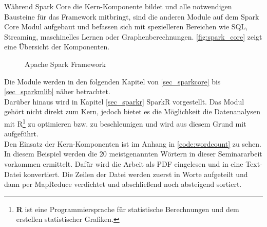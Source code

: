 \noindent
Während Spark Core die Kern-Komponente bildet und alle notwendigen Bausteine für das Framework mitbringt, sind die anderen Module auf dem Spark Core Modul aufgebaut und befassen sich mit spezielleren Bereichen wie SQL, Streaming, maschinelles Lernen oder Graphenberechnungen. \autoref{fig:spark_core} zeigt eine Übersicht der Komponenten. \\

\begin{figure}[h]
  \centering
  \caption{Apache Spark Framework \cite{DATABRICK_SPARK_KEY_TERMS}}\label{fig:spark_core}
\end{figure}


\noindent
Die Module werden in den folgenden Kapitel von \ref{sec_sparkcore} bis \ref{sec_sparkmlib} näher betrachtet. \\

\noindent
Darüber hinaus wird in Kapitel \ref{sec_sparkr} SparkR vorgestellt. Das Modul gehört nicht direkt zum Kern, jedoch bietet es die Möglichkeit die Datenanalysen mit R\footnote{\textbf{R} ist eine Programmiersprache für statistische Berechnungen und dem erstellen statistischer Grafiken. } zu optimieren bzw. zu beschleunigen und wird aus diesem Grund mit aufgeführt. \\

\noindent
Den Einsatz der Kern-Komponenten ist im Anhang in \autoref{code:wordcount} zu sehen. In diesem Beispiel werden die 20 meistgenannten Wörtern in dieser Seminararbeit vorkommen ermittelt. Dafür wird die Arbeit als PDF eingelesen und in eine Text-Datei konvertiert. Die Zeilen der Datei werden zuerst in Worte aufgeteilt und dann per MapReduce verdichtet und abschließend noch absteigend sortiert.




